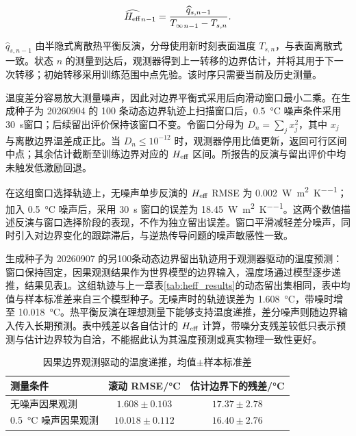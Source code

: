 \begin{equation}
  \widehat{{H_{\mathrm{eff}}}}_{n-1}
  =\frac{\widehat{q}_{s,n-1}}{{T_{\infty}}_{n-1}-T_{s,n}}.
  \label{eq:heff_observer}
\end{equation}

$\widehat q_{s,n-1}$ 由半隐式离散热平衡反演，分母使用新时刻表面温度 $T_{s,n}$，与表面离散式一致。状态 $n$ 的测量到达后，观测器得到上一转移的边界估计，并将其用于下一次转移；初始转移采用训练范围中点先验。该时序只需要当前及历史测量。

温度差分容易放大测量噪声，因此对边界平衡式采用后向滑动窗口最小二乘。在生成种子为 20260904 的 100 条动态边界轨迹上扫描窗口后，\SI{0.5}{\degreeCelsius} 噪声条件采用30~s窗口；后续留出评价保持该窗口不变。令窗口分母为 $D_n=\sum_j x_j^2$，其中 $x_j$ 与离散边界温差成正比。当 $D_n\leq10^{-12}$ 时，观测器停用比值更新，返回可行区间中点；其余估计截断至训练边界对应的 ${H_{\mathrm{eff}}}$ 区间。所报告的反演与留出评价中均未触发低激励回退。

在这组窗口选择轨迹上，无噪声单步反演的 ${H_{\mathrm{eff}}}$ RMSE 为 \SI{0.002}{\watt\per\square\metre\per\kelvin}；加入 \SI{0.5}{\degreeCelsius} 噪声后，采用 30~s 窗口的误差为 \SI{18.45}{\watt\per\square\metre\per\kelvin}。这两个数值描述反演与窗口选择阶段的表现，不作为独立留出误差。窗口平滑减轻差分噪声，同时引入对边界变化的跟踪滞后，与逆热传导问题的噪声敏感性一致\cite{frankel2007loads,chen2019online}。

生成种子为 20260907 的另100条动态边界留出轨迹用于观测器驱动的温度预测：窗口保持固定，因果观测结果作为世界模型的边界输入，温度场通过模型逐步递推，结果见表\ref{tab:causal_heff_observer}。这组轨迹与上一章表\ref{tab:heff_results}的动态留出集相同，表中均值与样本标准差来自三个模型种子。无噪声时的轨迹误差为 \SI{1.608}{\degreeCelsius}，带噪时增至 \SI{10.018}{\degreeCelsius}。热平衡反演在理想测量下能够支持温度递推，差分噪声则随边界输入传入长期预测。表中残差以各自估计的 ${H_{\mathrm{eff}}}$ 计算，带噪分支残差较低只表示预测与估计边界较为自洽，不能据此认为其温度预测或真实物理一致性更好。

\begin{table}[H]
  \centering
  \caption{因果边界观测驱动的温度递推，均值$\pm$样本标准差}
  \label{tab:causal_heff_observer}
  \begin{tabular}{lcc}
    \toprule
    测量条件 & 滚动 RMSE/\si{\degreeCelsius} & 估计边界下的残差/\si{\degreeCelsius} \\
    \midrule
    无噪声因果观测 & $1.608\pm0.103$ & $17.37\pm2.78$ \\
    \SI{0.5}{\degreeCelsius} 噪声因果观测 & $10.018\pm0.112$ & $16.40\pm2.76$ \\
    \bottomrule
  \end{tabular}
\end{table}

